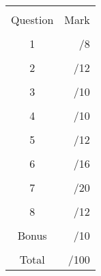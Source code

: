\documentclass[12pt]{article}
\begin{document}
 \begin{center}

$~$ \\

 \begin{tabular}{|c|r|} \hline
& \\
  Question & \hspace{5mm} Mark  \hspace{5mm} \\ \hline \hline &  \\
  1 & /8 \\ \hline
&  \\
  2 & /12 \\ \hline
&  \\
  3 & /10 \\ \hline
&  \\
  4 & /10 \\ \hline
&  \\
  5 & /12 \\ \hline
&  \\
6 & /16\\ \hline
&  \\
7 & /20 \\ \hline
&  \\
8 & /12\\ \hline
&  \\
Bonus & /10\\ \hline
&  \\
  Total & /100 \\ \hline
 \end{tabular}

 \end{center}

\newpage
\end{document}
